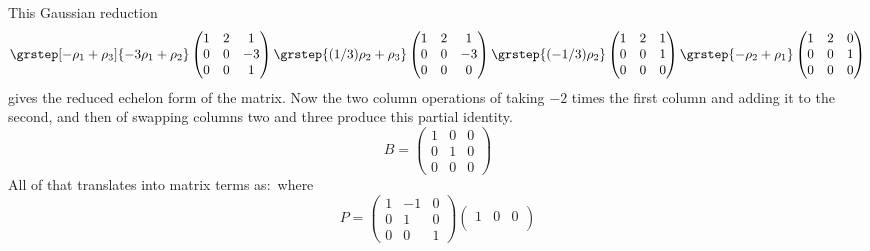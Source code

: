 \begin{ans}{3}
      This Gaussian reduction
      \begin{equation*}
        \grstep[-\rho_1+\rho_3]{-3\rho_1+\rho_2}
        \begin{pmatrix}
          1  &2  &1  \\
          0  &0  &-3 \\
          0  &0  &1
        \end{pmatrix}
        \grstep{(1/3)\rho_2+\rho_3}
        \begin{pmatrix}
          1  &2  &1  \\
          0  &0  &-3 \\
          0  &0  &0
        \end{pmatrix}
        \grstep{(-1/3)\rho_2}
        \begin{pmatrix}
          1  &2  &1  \\
          0  &0  &1 \\
          0  &0  &0
        \end{pmatrix}
        \grstep{-\rho_2+\rho_1}
        \begin{pmatrix}
          1  &2  &0  \\
          0  &0  &1 \\
          0  &0  &0
        \end{pmatrix}
      \end{equation*}
      gives the reduced echelon form of the matrix.
      Now the two column operations of taking $-2$ times the first column
      and adding it to the second, and then of swapping columns two and three
      produce this partial identity.
      \begin{equation*}
        B=\begin{pmatrix}
          1  &0  &0  \\
          0  &1  &0  \\
          0  &0  &0
        \end{pmatrix}
      \end{equation*}
      All of that translates into matrix terms as:~where
      \begin{equation*}
        P=
        \begin{pmatrix}
          1  &-1    &0  \\
          0  &1     &0  \\
          0  &0     &1
        \end{pmatrix}
        \begin{pmatrix}
          1  &0    &0  \\

\end{pmatrix}
\end{equation*}
\end{ans}

